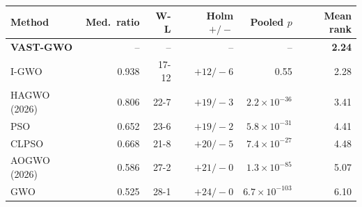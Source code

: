 \begin{tabular}{lrrrrr}
\toprule
Method & Med.\ ratio & W-L & Holm $+/-$ & Pooled $p$ & Mean rank\\
\midrule
\textbf{VAST-GWO} & -- & -- & -- & -- & \textbf{2.24}\\
I-GWO & 0.938 & 17-12 & $+12/-6$ & 0.55 & 2.28\\
HAGWO (2026) & 0.806 & 22-7 & $+19/-3$ & $2.2\times10^{-36}$ & 3.41\\
PSO & 0.652 & 23-6 & $+19/-2$ & $5.8\times10^{-31}$ & 4.41\\
CLPSO & 0.668 & 21-8 & $+20/-5$ & $7.4\times10^{-27}$ & 4.48\\
AOGWO (2026) & 0.586 & 27-2 & $+21/-0$ & $1.3\times10^{-85}$ & 5.07\\
GWO & 0.525 & 28-1 & $+24/-0$ & $6.7\times10^{-103}$ & 6.10\\
\bottomrule
\end{tabular}
